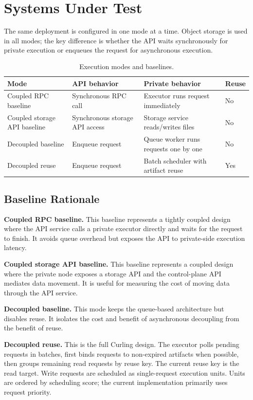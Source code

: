 \documentclass[11pt]{article}
\begin{document}
\section{Systems Under Test}

The same deployment is configured in one mode at a time.  Object storage is
used in all modes; the key difference is whether the API waits synchronously for
private execution or enqueues the request for asynchronous execution.

\begin{table}[h]
\centering
\caption{Execution modes and baselines.}
\label{tab:modes}
\begin{tabular}{llll}
\toprule
\textbf{Mode} & \textbf{API behavior} & \textbf{Private behavior} & \textbf{Reuse} \\
\midrule
Coupled RPC baseline &
Synchronous RPC call &
Executor runs request immediately &
No \\
Coupled storage API baseline &
Synchronous storage API access &
Storage service reads/writes files &
No \\
Decoupled baseline &
Enqueue request &
Queue worker runs requests one by one &
No \\
Decoupled reuse &
Enqueue request &
Batch scheduler with artifact reuse &
Yes \\
\bottomrule
\end{tabular}
\end{table}

\subsection{Baseline Rationale}

\textbf{Coupled RPC baseline.}
This baseline represents a tightly coupled design where the API service calls a
private executor directly and waits for the request to finish.  It avoids queue
overhead but exposes the API to private-side execution latency.

\textbf{Coupled storage API baseline.}
This baseline represents a coupled design where the private node exposes a
storage API and the control-plane API mediates data movement.  It is useful for
measuring the cost of moving data through the API service.

\textbf{Decoupled baseline.}
This mode keeps the queue-based architecture but disables reuse.  It isolates
the cost and benefit of asynchronous decoupling from the benefit of reuse.

\textbf{Decoupled reuse.}
This is the full Curling design.  The executor polls pending requests in
batches, first binds requests to non-expired artifacts when possible, then
groups remaining read requests by reuse key.  The current reuse key is the read
target.  Write requests are scheduled as single-request execution units.  Units
are ordered by scheduling score; the current implementation primarily uses
request priority.
\end{document}
